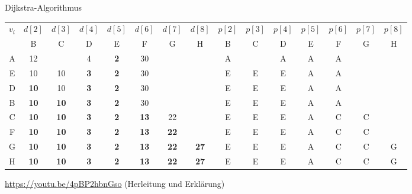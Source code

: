 \begin{example}{Dijkstra-Algorithmus}
\begin{center}
        \begin{tabular}{|c|ccccccc|ccccccc|}
            \hline
            \multirow{2}{*}{$v_i$} & $d[2]$      & $d[3]$      & $d[4]$     & $d[5]$     & $d[6]$      & $d[7]$      & $d[8]$      & $p[2]$ & $p[3]$ & $p[4]$ & $p[5]$ & $p[6]$ & $p[7]$ & $p[8]$ \\ \cline{2-15}
                                   & B           & C           & D          & E          & F           & G           & H           & B      & C      & D      & E      & F      & G      & H      \\
            \hline
            A                      & 12          &             & 4          & \textbf{2} & 30          &             &             & A      &        & A      & A      & A      &        &        \\
            E                      & 10          & 10          & \textbf{3} & \textbf{2} & 30          &             &             & E      & E      & E      & A      & A      &        &        \\
            D                      & \textbf{10} & 10          & \textbf{3} & \textbf{2} & 30          &             &             & E      & E      & E      & A      & A      &        &        \\
            B                      & \textbf{10} & \textbf{10} & \textbf{3} & \textbf{2} & 30          &             &             & E      & E      & E      & A      & A      &        &        \\
            C                      & \textbf{10} & \textbf{10} & \textbf{3} & \textbf{2} & \textbf{13} & 22          &             & E      & E      & E      & A      & C      & C      &        \\
            F                      & \textbf{10} & \textbf{10} & \textbf{3} & \textbf{2} & \textbf{13} & \textbf{22} &             & E      & E      & E      & A      & C      & C      &        \\
            G                      & \textbf{10} & \textbf{10} & \textbf{3} & \textbf{2} & \textbf{13} & \textbf{22} & \textbf{27} & E      & E      & E      & A      & C      & C      & G      \\
            H                      & \textbf{10} & \textbf{10} & \textbf{3} & \textbf{2} & \textbf{13} & \textbf{22} & \textbf{27} & E      & E      & E      & A      & C      & C      & G      \\
            \hline
        \end{tabular}
    \end{center}

    \vspace{1em}

    \url{https://youtu.be/4pBP2hbnGso} (Herleitung und Erklärung)
\end{example}

